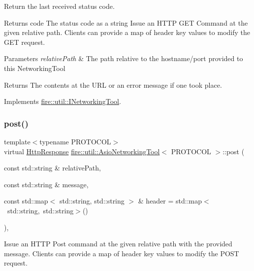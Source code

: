 Return the last received status code.

\begin{DoxyReturn}{Returns}
code The status code as a string Issue an H\+T\+TP G\+ET Command at the given relative path. Clients can provide a map of header key values to modify the G\+ET request.
\end{DoxyReturn}

\begin{DoxyParams}{Parameters}
{\em relative\+Path} & The path relative to the hostname/port provided to this Networking\+Tool \\
\hline
\end{DoxyParams}
\begin{DoxyReturn}{Returns}
The contents at the U\+RL or an error message if one took place. 
\end{DoxyReturn}


Implements \hyperlink{a01609_a44b81ebf8421f0e32ed99b5e372ef007}{fire\+::util\+::\+I\+Networking\+Tool}.

\mbox{\label{a01601_a2ac524ceef89fceb928cf74420bf90a5}} 
\subsubsection{\texorpdfstring{post()}{post()}}
{\footnotesize\ttfamily template$<$typename P\+R\+O\+T\+O\+C\+OL$>$ \\
virtual \hyperlink{a01605}{Http\+Response} \hyperlink{a01601}{fire\+::util\+::\+Asio\+Networking\+Tool}$<$ P\+R\+O\+T\+O\+C\+OL $>$\+::post (\begin{DoxyParamCaption}\item[{const std\+::string \&}]{relative\+Path,  }\item[{const std\+::string \&}]{message,  }\item[{const std\+::map$<$ std\+::string, std\+::string $>$ \&}]{header = {\ttfamily std\+:\+:map$<$~std\+:\+:string,~std\+:\+:string$>$()} }\end{DoxyParamCaption})\hspace{0.3cm}{\ttfamily [inline]}, {\ttfamily [virtual]}}

Issue an H\+T\+TP Post command at the given relative path with the provided message. Clients can provide a map of header key values to modify the P\+O\+ST request.


